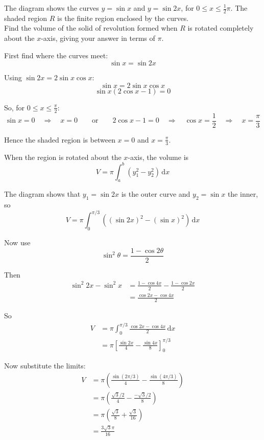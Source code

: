 \documentclass[leqno]{article}
\begin{document}
\begin{enumerate}[
  label=\textbf{\arabic*.},
  leftmargin=*,
  topsep=0pt,
  partopsep=0pt,
  parsep=0pt
]
The diagram shows the curves $y = \sin x$ and $y = \sin 2x$, for $0 \leq x \leq \frac{1}{2}\pi$. The shaded region $R$ is the finite region enclosed by the curves. \\

Find the volume of the solid of revolution formed when $R$ is rotated completely about the $x$-axis, giving your answer in terms of $\pi$.  \\

\vspace*{10pt}

\begin{djsSolution}
First find where the curves meet:
\[
\sin x=\sin 2x
\]

Using \(\sin 2x=2\sin x\cos x\):
\[
\sin x=2\sin x\cos x
\]
\[
\sin x(2\cos x-1)=0
\]

So, for \(0\le x\le \frac{\pi}{2}\):
\[
\sin x=0 \quad\Longrightarrow\quad x=0
\qquad \text{or} \qquad
2\cos x-1=0 \quad\Longrightarrow\quad \cos x=\frac12 \quad\Longrightarrow\quad x=\frac{\pi}{3}
\]

Hence the shaded region is between \(x=0\) and \(x=\frac{\pi}{3}\).

When the region is rotated about the \(x\)-axis, the volume is
\[
V=\pi\int_a^b \left(y_1^2-y_2^2\right)\,\mathrm{d}x
\]

The diagram shows that \(y_1=\sin 2x\) is the outer curve and \(y_2=\sin x\) the inner, so
\[
V=\pi\int_0^{\pi/3}\left((\sin 2x)^2-(\sin x)^2\right)\,\mathrm{d}x
\]

Now use
\[
\sin^2\theta=\frac{1-\cos 2\theta}{2}
\]

Then
\begin{align*}
\sin^2 2x-\sin^2 x
&=\frac{1-\cos 4x}{2}-\frac{1-\cos 2x}{2}\\
&=\frac{\cos 2x-\cos 4x}{2}
\end{align*}

So
\begin{align*}
V
&=\pi\int_0^{\pi/3}\frac{\cos 2x-\cos 4x}{2}\,\mathrm{d}x\\
&=\pi\left[\frac{\sin 2x}{4}-\frac{\sin 4x}{8}\right]_0^{\pi/3}
\end{align*}

Now substitute the limits:
\begin{align*}
V
&=\pi\left(\frac{\sin(2\pi/3)}{4}-\frac{\sin(4\pi/3)}{8}\right)\\
&=\pi\left(\frac{\sqrt3/2}{4}-\frac{-\sqrt3/2}{8}\right)\\
&=\pi\left(\frac{\sqrt3}{8}+\frac{\sqrt3}{16}\right)\\
&=\frac{3\sqrt3\pi}{16}
\end{align*}
\end{djsSolution}



\end{enumerate}
\end{document}
